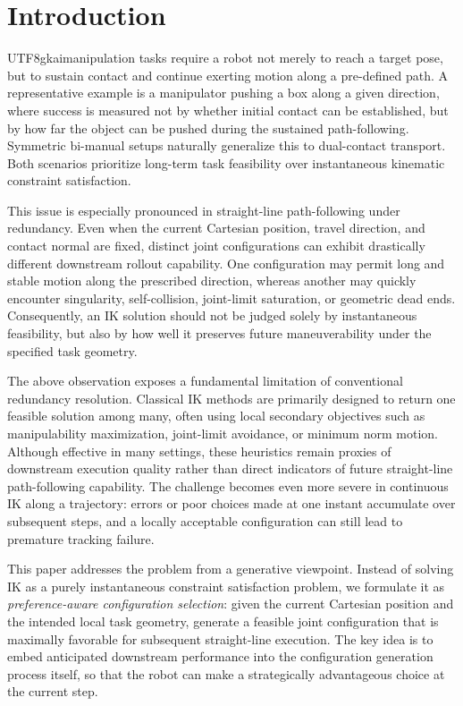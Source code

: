 \documentclass[journal, twoside]{IEEEtran}
\newcommand{\xinyi}[1]{{\color{darkorange}\begin{CJK*}{UTF8}{gkai}#1\end{CJK*}}}
\begin{document}

\section{Introduction} %

 \xinyi{manipulation tasks require a robot not merely to reach a target pose, but to sustain contact and continue exerting motion along a pre-defined path. A representative example is a manipulator pushing a box along a given direction, where success is measured not by whether initial contact can be established, but by how far the object can be pushed during the sustained path-following. Symmetric bi-manual setups naturally generalize this to dual-contact transport. Both scenarios prioritize long-term task feasibility over instantaneous kinematic constraint satisfaction.}

This issue is especially pronounced in straight-line path-following under redundancy. Even when the current Cartesian position, travel direction, and contact normal are fixed, distinct joint configurations can exhibit drastically different downstream rollout capability. One configuration may permit long and stable motion along the prescribed direction, whereas another may quickly encounter singularity, self-collision, joint-limit saturation, or geometric dead ends. Consequently, an IK solution should not be judged solely by instantaneous feasibility, but also by how well it preserves future maneuverability under the specified task geometry.

The above observation exposes a fundamental limitation of conventional redundancy resolution. Classical IK methods are primarily designed to return one feasible solution among many, often using local secondary objectives such as manipulability maximization, joint-limit avoidance, or minimum norm motion. Although effective in many settings, these heuristics remain proxies of downstream execution quality rather than direct indicators of future straight-line path-following capability. The challenge becomes even more severe in continuous IK along a trajectory: errors or poor choices made at one instant accumulate over subsequent steps, and a locally acceptable configuration can still lead to premature tracking failure.

This paper addresses the problem from a generative viewpoint. Instead of solving IK as a purely instantaneous constraint satisfaction problem, we formulate it as \emph{preference-aware configuration selection}: given the current Cartesian position and the intended local task geometry, generate a feasible joint configuration that is maximally favorable for subsequent straight-line execution. The key idea is to embed anticipated downstream performance into the configuration generation process itself, so that the robot can make a strategically advantageous choice at the current step.
\end{document}
